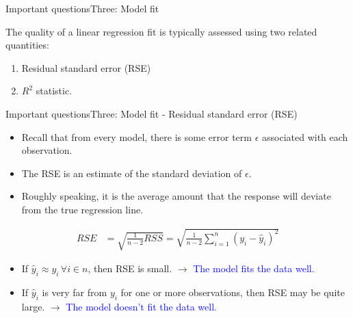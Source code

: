 \begin{frame}{Important questions}{Three: Model fit}

The quality of a linear regression fit is typically assessed using two related quantities: \pause

\begin{enumerate}
    \item Residual standard error (RSE) \pause
    \item $R^2$ statistic.
 
\end{enumerate}
\end{frame}


\begin{frame}{Important questions}{Three: Model fit - Residual standard error (RSE)}

\begin{itemize}
    \item Recall that from every model, there is some error term $\epsilon$ associated with each observation. \pause

    \item The RSE is an estimate of the standard
deviation of $\epsilon$. \pause

    \item Roughly speaking, it is the average amount that the response will deviate from the true regression line. \pause
  
\end{itemize}

\begin{align*}
    RSE &= \sqrt{\frac{1}{n-2} RSS} = \sqrt{\frac{1}{n-2} \sum_{i=1}^n (y_i - \hat{y}_i)^2}
\end{align*} \pause

\begin{itemize}
    \item If $\hat{y}_i \approx y_i \, \forall i \in n$, then RSE is small. $\rightarrow$ \textcolor{blue}{The model fits the data well.} \pause

    \item If $\hat{y}_i$ is very far from $y_i$ for one or more observations, then RSE may be quite large. $\rightarrow$ \textcolor{blue}{The model doesn’t fit the data well.}
\end{itemize}


\end{frame}


